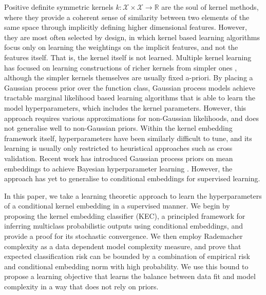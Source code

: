 \documentclass{article}
\begin{document}
	Positive definite symmetric kernels $k : \mathcal{X} \times \mathcal{X} \to \mathbb{R}$ are the soul of kernel methods, where they provide a coherent sense of similarity between two elements of the same space through implicitly defining higher dimensional features. However, they are most often selected by design, in which kernel based learning algorithms focus only on learning the weightings on the implicit features, and not the features itself. That is, the kernel itself is not learned. Multiple kernel learning has focused on learning constructions of richer kernels from simpler ones \citep{gonen2011multiple, zien2007multiclass}, although the simpler kernels themselves are usually fixed a-priori. By placing a Gaussian process prior over the function class, Gaussian process models \citep{rasmussen2006gaussian} achieve tractable marginal likelihood based learning algorithms that is able to learn the model hyperparameters, which includes the kernel parameters. However, this approach requires various approximations for non-Gaussian likelihoods, and does not generalise well to non-Gaussian priors. Within the kernel embedding framework itself, hyperparameters have been similarly difficult to tune, and its learning is usually only restricted to heuristical approaches such as cross validation. Recent work has introduced Gaussian process priors on mean embeddings to achieve Bayesian hyperparameter learning \citep{flaxman2016bayesian}. However, the approach has yet to generalise to conditional embeddings for supervised learning.
	
	In this paper, we take a learning theoretic approach to learn the hyperparameters of a conditional kernel embedding in a supervised manner. We begin by proposing the kernel embedding classifier (KEC), a principled framework for inferring multiclass probabilistic outputs using conditional embeddings, and provide a proof for its stochastic convergence. We then employ Rademacher complexity as a data dependent model complexity measure, and prove that expected classification risk can be bounded by a combination of empirical risk and conditional embedding norm with high probability. We use this bound to propose a learning objective that learns the balance between data fit and model complexity in a way that does not rely on priors.
	
\end{document}
